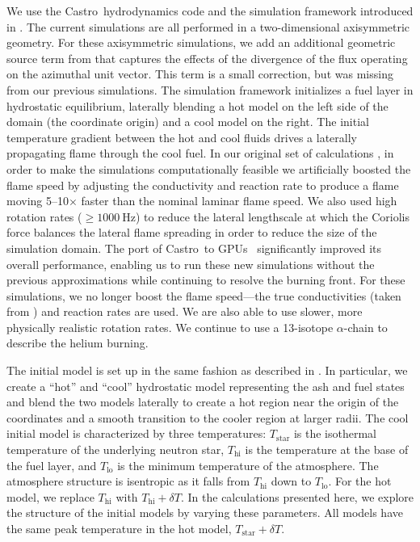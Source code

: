 \documentclass[preprint,times,tighten]{aastex63}
\newcommand{\castro}{{\sf Castro}}
\begin{document}
We use the \castro\ hydrodynamics code \citep{castro,castro_joss} and
the simulation framework introduced in \citet{flame_wave1}.  The
current simulations are all performed in a two-dimensional
axisymmetric geometry.  For these axisymmetric simulations, we add an
additional geometric source term from \citet{bernard-champmartin} that
captures the effects of the divergence of the flux operating on the
azimuthal unit vector.  This term is a small correction, but was
missing from our previous simulations.  The simulation framework
initializes a fuel layer in hydrostatic equilibrium, laterally
blending a hot model on the left side of the domain (the coordinate
origin) and a cool model on the right.  The initial temperature
gradient between the hot and cool fluids drives a laterally
propagating flame through the cool fuel.  In our original set of
calculations \citep{flame_wave1}, in order to make the 
simulations computationally feasible we artificially boosted the flame speed by adjusting the
conductivity and reaction rate to produce a flame moving 5--10$\times$
faster than the nominal laminar flame speed.  We also used high
rotation rates ($\geq 1000~\mathrm{Hz}$) to reduce the lateral lengthscale at which the Coriolis
force balances the lateral flame spreading in order to reduce the size 
of the simulation domain. The port of \castro\ to GPUs~\citep{sc20_gpu} 
significantly improved its overall performance, enabling
us to run these new simulations without the previous approximations while
continuing to resolve the burning front. For these
simulations, we no longer boost the flame speed---the true
conductivities (taken from \citealt{Timmes00}) and reaction rates are
used. We are also able to use slower, more physically realistic rotation rates.
  We continue to use a 13-isotope $\alpha$-chain to describe the
helium burning.  

The initial model is set up in the same fashion as described in
\citet{flame_wave1}.  In particular, we create a ``hot'' and ``cool''
hydrostatic model representing the ash and fuel states and blend the
two models laterally to create a hot region near the origin of the
coordinates and a smooth transition to the cooler region at larger
radii.  The cool initial model is characterized by three temperatures:
$T_\mathrm{star}$ is the isothermal temperature of the underlying
neutron star, $T_\mathrm{hi}$ is the temperature at the base of the
fuel layer, and $T_\mathrm{lo}$ is the minimum temperature of the
atmosphere. The atmosphere structure is isentropic as it falls from
$T_\mathrm{hi}$ down to $T_\mathrm{lo}$.  For the hot model, we
replace $T_\mathrm{hi}$ with $T_\mathrm{hi} + \delta T$.  In the
calculations presented here, we explore the structure of the initial
models by varying these parameters.  All models have the same
peak temperature in the hot model, $T_\mathrm{star} + \delta T$.
\end{document}
